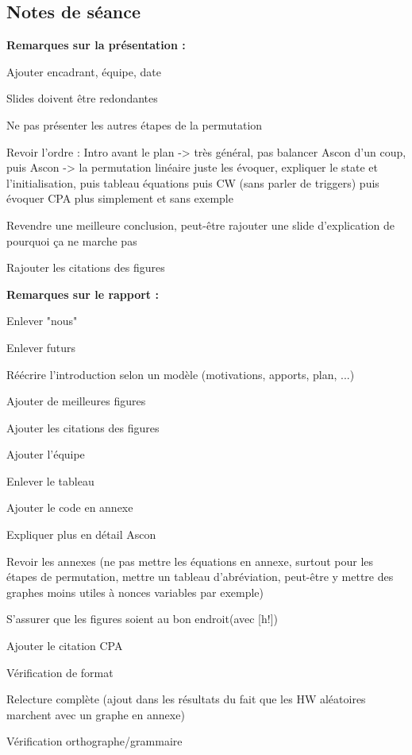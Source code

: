 \documentclass[12pt]{article}
\newcommand{\cmark}{\ding{51}}%
\newcommand{\done}{\rlap{$\square$}{\raisebox{2pt}{\large\hspace{1pt}\cmark}}%
	\hspace{-2.5pt}}
\begin{document}
	\subsection{Notes de séance}
	\textbf{Remarques sur la présentation :} 
	\begin{todolist}
		\item Ajouter encadrant, équipe, date
		\item Slides doivent être redondantes
		\item Ne pas présenter les autres étapes de la permutation
		\item Revoir l'ordre : Intro avant le plan -> très général, pas balancer Ascon d'un coup, puis Ascon -> la permutation linéaire juste les évoquer, expliquer le state et l'initialisation, puis tableau équations puis CW (sans parler de triggers) puis évoquer CPA plus simplement et sans exemple
		\item Revendre une meilleure conclusion, peut-être rajouter une slide d'explication de pourquoi ça ne marche pas
		\item Rajouter les citations des figures
	\end{todolist}
	
	\noindent \textbf{Remarques sur le rapport :} 
	\begin{todolist}
		\item[\done] Enlever "nous"
		\item[\done] Enlever futurs
		\item[\done] Réécrire l'introduction selon un modèle (motivations, apports, plan, ...)
		\item[\done] Ajouter de meilleures figures
		\item[\done] Ajouter les citations des figures
		\item[\done] Ajouter l'équipe
		\item[\done] Enlever le tableau
		\item[\done] Ajouter le code en annexe
		\item[\done] Expliquer plus en détail Ascon
		\item[\done] Revoir les annexes (ne pas mettre les équations en annexe, surtout pour les étapes de permutation, mettre un tableau d'abréviation, peut-être y mettre des graphes moins utiles à nonces variables par exemple)
		\item[\done] S'assurer que les figures soient au bon endroit(avec [h!])
		\item[\done] Ajouter le citation CPA
		\item[\done] Vérification de format
		\item Relecture complète (ajout dans les résultats du fait que les HW aléatoires marchent avec un graphe en annexe)
		\item[\done] Vérification orthographe/grammaire
	\end{todolist}
	
\end{document}
